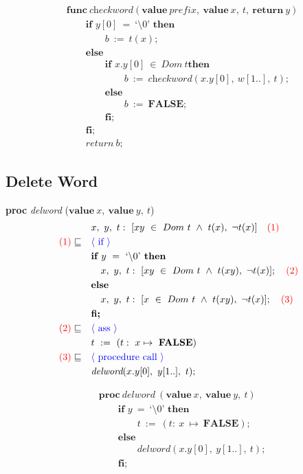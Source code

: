\documentclass[a4paper, fleqn]{article}
\newcommand{\reason}[1]{\text{\textcolor{blue}{$\langle$ #1 $\rangle$}}}
\newcommand{\num}[1]{\text{\textcolor{red}{(#1)}}}
\begin{document}
\begin{align*}
		&\textbf{func}\ \textit{checkword}(\textbf{value}\ \textit{prefix},\ \textbf{value}\ x,\ t,\ \textbf{return}\ y) \\ 
		&\qquad\textbf{if } y[0]\ =\ \text{`\textbackslash0'}\textbf{ then} \\
		&\qquad\qquad b\ :=\ t(x); \\
		&\qquad\textbf{else} \\
		&\qquad\qquad\textbf{if } x.y[0]\ \in\ Dom\ t\textbf{then} \\
		&\qquad\qquad\qquad b\ :=\ \textit{checkword}(x.y[0],\ w[1..],\ t);\\
		&\qquad\qquad\textbf{else} \\
		&\qquad\qquad\qquad b\ :=\ \textbf{FALSE};\\
		&\qquad\qquad\textbf{fi;}\\
		&\qquad\textbf{fi;}\\
		&\qquad \textit{return}\ b;
\end{align*}

\subsection{Delete Word}
\textbf{proc} \textit{delword} ($\textbf{value}\ x,\ \textbf{value}\ y,\ t$)
\begin{align*}
		&\quad x,\ y,\ t:\ [xy\ \in\ Dom\ t\ \land\ t(x),\ \neg t(x)]\quad\num{1} \\
		\num{1}\sqsubseteq&\quad\reason{if} \\
		&\quad \textbf{if } y\ =\ \text{`\textbackslash0'} \textbf{ then} \\
		&\qquad x,\ y,\ t:\ [xy\ \in\ Dom\ t\ \land\ t(xy),\ \neg t(x)];\quad\num{2} \\
		&\quad \textbf{else} \\
		&\qquad x,\ y,\ t:\ [x\ \in\ Dom\ t\ \land\ t(xy),\ \neg t(x)]; \quad\num{3} \\
		&\quad \textbf{fi;} \\
		\num{2}\sqsubseteq&\quad\reason{ass} \\
		&\quad t\ :=\ (t:\ x\mapsto\ \textbf{FALSE}) \\
		\num{3}\sqsubseteq&\quad\reason{procedure call} \\
		&\quad \textit{delword}(x.y[0],\ y[1..],\ t);
\end{align*}

\begin{align*}
		&\textbf{proc}\ \textit{delword}\ (\textbf{value}\ x,\ \textbf{value}\ y,\ t) \\
		&\qquad\textbf{if } y\ =\ \text{`\textbackslash0'} \textbf{ then} \\
		&\qquad\qquad t\ :=\ (t:\ x\ \mapsto\ \textbf{FALSE}); \\
		&\qquad\textbf{else} \\
		&\qquad\qquad \textit{delword}(x.y[0],\ y[1..],\ t); \\
		&\qquad\textbf{fi;}
\end{align*}
\end{document}
